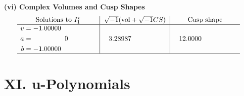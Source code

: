 \documentclass[1p]{elsarticle_modified}
\theoremstyle{definition}
\newcommand{\I}{\sqrt{-1}}
\begin{document}
\newpage\flushleft \textbf{(vi) Complex Volumes and Cusp Shapes}
$$\begin{array}{c|c|c}  
\text{Solutions to }I^v_{1}& \I (\text{vol} + \sqrt{-1}CS) & \text{Cusp shape}\\
 \hline 
\begin{aligned}
v &= -1.00000\phantom{ +0.000000I} \\
a &= \phantom{-0.000000 } 0 \\
b &= -1.00000\phantom{ +0.000000I}\end{aligned}
 & \phantom{-}3.28987\phantom{ +0.000000I} & \phantom{-}12.0000\phantom{ +0.000000I}\\
 \hline 
 \end{array}$$\newpage
\newpage\renewcommand{\arraystretch}{1}
\centering \section*{ XI. u-Polynomials}
\end{document}
